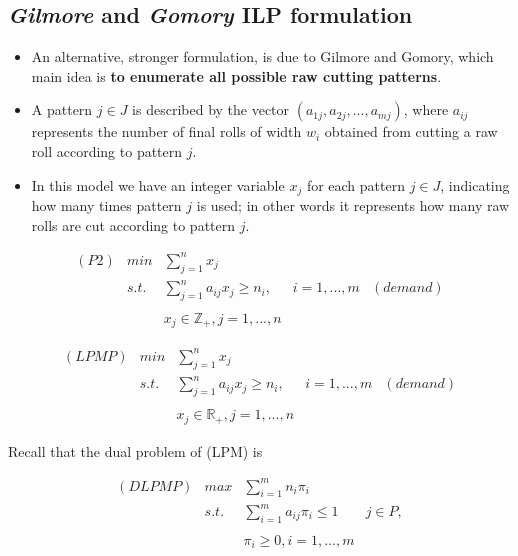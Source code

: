 \documentclass[10pt,a4paper]{article}
\begin{document}
\subsection{\textit{Gilmore} and \textit{Gomory} ILP formulation}

\begin{itemize}
\item An alternative, stronger formulation, is due to Gilmore and Gomory, which main idea is \textbf{to enumerate all possible raw cutting patterns}. 

\item A pattern $j \in J$ is described by the vector $(a_{1j},a_{2j},...,a_{mj})$, where $a_{ij}$ represents the number of final rolls of width $w_i$ obtained from cutting a raw roll according to pattern $j$. 

\item In this model we have an integer variable $x_j$ for each pattern $j \in J$, indicating how many times pattern $j$ is used; in other words it represents how many raw rolls are cut according to pattern $j$. 
\end{itemize}


\begin{equation}\label{eqn:P2}
\begin{array} {lllrr} 

(P2) & min & \displaystyle\sum_{j = 1}^{n} x_j && \\
& s.t. & \displaystyle\sum_{j = 1}^{n} a_{ij} x_j \geq n_i, & i = 1,...,m & (demand) \\\\

& & x_j \in \mathbb{Z}_{+}, j = 1,...,n  &&
\end{array}
\end{equation}


\begin{equation}\label{eqn:LPMP}
\begin{array} {lllrr} 

(LPMP) & min & \displaystyle\sum_{j = 1}^{n} x_j && \\
& s.t. & \displaystyle\sum_{j = 1}^{n} a_{ij} x_j \geq n_i, & i = 1,...,m & (demand) \\\\
& & x_j \in \mathbb{R}_{+}, j = 1,...,n  &&
\end{array}
\end{equation}

Recall that the dual problem of (LPM) is

\begin{equation}\label{eqn:DLPM}
\begin{array} {lllr} 
(DLPMP) & max & \displaystyle\sum_{i = 1}^{m} n_i\pi_i & \\
& s.t. & \displaystyle\sum_{i = 1}^{m} a_{ij}\pi_i \leq 1 & j \in P, \\\\
&& \pi_i \geq 0, i = 1,...,m &
\end{array}
\end{equation}
\end{document}
